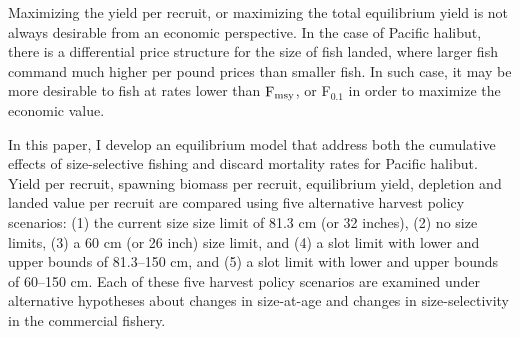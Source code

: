 Maximizing the yield per recruit, or maximizing the total equilibrium yield is not always desirable from an economic perspective.  In the case of Pacific halibut, there is a differential price structure for the size of fish landed, where larger fish command much higher per pound prices than smaller fish. In such case, it may be more desirable to fish at rates lower than $\rm{F_{msy}}$, or F$_{0.1}$ in order to maximize the economic value.

In this paper, I develop an equilibrium model that address both the cumulative effects of size-selective fishing and discard mortality rates for Pacific halibut.  Yield per recruit, spawning biomass per recruit, equilibrium yield, depletion and landed value per recruit are compared using five alternative harvest policy scenarios: (1) the current size size limit of 81.3 cm (or 32 inches), (2) no size limits, (3) a 60 cm (or 26 inch) size limit, and (4) a slot limit with lower and upper bounds of 81.3--150 cm, and (5) a slot limit with lower and upper bounds of 60--150 cm.  Each of these five harvest policy scenarios are examined under alternative hypotheses about changes in size-at-age and changes in size-selectivity in the commercial fishery.





